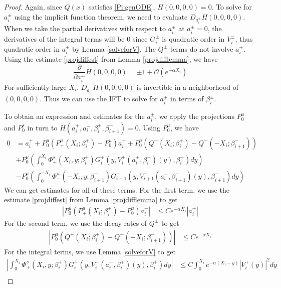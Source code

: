 \documentclass[thesis.tex]{subfiles}
\begin{document}
\begin{lemma}
\begin{proof}
Again, since $Q(x)$ satisfies \eqref{Pi:genODE}, $H(0, 0, 0, 0) = 0$. To  solve for $a_i^\pm$ using the implicit function theorem, we need to evaluate $D_{a_i^\pm} H(0, 0, 0, 0)$. When we take the partial derivatives with respect to $a_i^\pm$ at $a_i^\pm = 0$, the derivatives of the integral terms will be 0 since $G_i^\pm$ is quadratic order in $V_i^\pm$, thus quadratic order in $a_i^\pm$ by Lemma \ref{solveforV}. The $Q^\pm$ terms do not involve $a_i^\pm$. Using the estimate \eqref{projdiffest} from Lemma \ref{projdifflemma}, we have 
\[
\frac{\partial}{\partial a_i^\pm} H(0, 0, 0, 0) = \pm 1 + \mathcal{O} (e^{-\alpha X_i})
\]
For sufficiently large $X_i$, $D_{a_i^\pm} H(0, 0, 0, 0)$ is invertible in a neighborhood of $(0, 0, 0, 0)$. Thus we can use the IFT to solve for $a_i^\pm$ in terms of $\beta_i^\pm$. 

To obtain an expression and estimates for the $a_i^\pm$, we apply the projections $P^u_0$ and $P^s_0$ in turn to $H(a_i^+, a_i^-, \beta_i^+, \beta_{i+1}^-) = 0$. Using $P^u_0$, we have
\begin{equation}\label{Ps0aiplus}
\begin{aligned}
0 &= a_i^+ + P^u_0(P^u_+(X_i; \beta_i^+) -  P^u_0)a_i^+ 
+ P^u_0 \left( Q^+(X_i; \beta_i^+) - Q^-(-X_i; \beta_{i+1}^-) \right)\\
&+ P^u_0 \left( \int_0^{X_i} \Phi_+^s(X_i, y; \beta_i^+) G_i^+(y, V_i^+(a_i^+, \beta_i^+)(y),\beta_i^+)dy \right) \\
&- P^u_0 \left( \int_0^{-X_i} \Phi_-^u(-X_i, y; \beta_{i+1}^-) G_{i+1}^-(y, V_{i+1}^-(a_i^-, \beta_{i+1}^-)(y),\beta_{i+1}^-) dy \right)
\end{aligned}
\end{equation}
We can get estimates for all of these terms. For the first term, we use the estimate \eqref{projdiffest} from Lemma \ref{projdifflemma} to get 
\begin{align*}
|P^u_0(P^u_+(X_i; \beta_i^+) -  P^u_0)a_i^+ | &\leq C e^{-\alpha X_i} |a_i^+|
\end{align*}
For the second term, we use the decay rates of $Q^\pm$ to get
\begin{align*}
|P^u_0 \left( Q^+(X_i; \beta_i^+) - Q^-(-X_i; \beta_{i+1}^-)  \right)| &\leq C e^{-\alpha X_i}
\end{align*}
For the integral terms, we use Lemma \ref{solveforV} to get
\begin{align*}
\left| \int_0^{X_i} \Phi_+^s(X_i, y; \beta_i^+) G_i^+(y, V_i^+(a_i^+, \beta_i^+)(y),\beta_i^+)dy \right| &\leq C \int_0^{X_i}e^{-\alpha(X_i - y)} |V_i^+(y)|^2 dy \\

\end{align*}
\end{proof}
\end{lemma}
\end{document}
